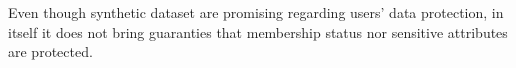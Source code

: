 Even though synthetic dataset are promising regarding users' data protection, in itself it does not bring guaranties that membership status nor sensitive attributes are protected.
